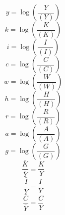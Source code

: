 \begin{dmath}
{y}=\log\left(\frac{{Y}}{({Y})}\right)
\end{dmath}
\begin{dmath}
{k}=\log\left(\frac{{K}}{({K})}\right)
\end{dmath}
\begin{dmath}
{i}=\log\left(\frac{{I}}{({I})}\right)
\end{dmath}
\begin{dmath}
{c}=\log\left(\frac{{C}}{({C})}\right)
\end{dmath}
\begin{dmath}
{w}=\log\left(\frac{{W}}{({W})}\right)
\end{dmath}
\begin{dmath}
{h}=\log\left(\frac{{H}}{({H})}\right)
\end{dmath}
\begin{dmath}
{r}=\log\left(\frac{{R}}{({R})}\right)
\end{dmath}
\begin{dmath}
{a}=\log\left(\frac{{A}}{({A})}\right)
\end{dmath}
\begin{dmath}
{g}=\log\left(\frac{{G}}{({G})}\right)
\end{dmath}
\begin{dmath}
{\frac{\bar{K}}{\bar{Y}}}=\frac{{K}}{{Y}}
\end{dmath}
\begin{dmath}
{\frac{\bar{I}}{\bar{Y}}}=\frac{{I}}{{Y}}
\end{dmath}
\begin{dmath}
{\frac{\bar{C}}{\bar{Y}}}=\frac{{C}}{{Y}}
\end{dmath}
